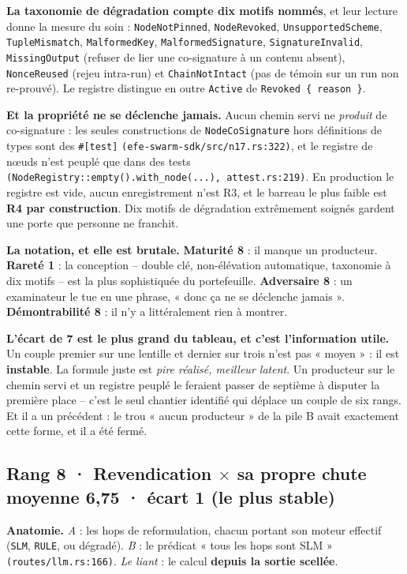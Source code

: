 \documentclass[10pt]{article}
\newcommand{\best}[1]{{\color{green}\textbf{#1}}}
\newcommand{\pire}[1]{{\color{red}\textbf{#1}}}
\newcommand{\sz}[1]{{\small\color{grey}\textsf{#1}}}
\newcommand{\code}[1]{\texttt{\small #1}}
\newcommand{\x}{$\times$}
\newcommand{\loc}[1]{{\footnotesize\color{grey}\texttt{#1}}}
\newcommand{\couple}[4]{%
  \subsection{#1 · #2 \hfill {\normalsize\color{grey}moyenne \textbf{#3} · écart #4}}}
\begin{document}
\textbf{La taxonomie de dégradation compte dix motifs nommés}, et leur lecture donne la mesure du
soin : \code{NodeNotPinned}, \code{NodeRevoked}, \code{UnsupportedScheme}, \code{TupleMismatch},
\code{MalformedKey}, \code{MalformedSignature}, \code{SignatureInvalid}, \code{MissingOutput}
\sz{(refuser de lier une co-signature à un contenu absent)}, \code{NonceReused} \sz{(rejeu intra-run)}
et \code{ChainNotIntact} \sz{(pas de témoin sur un run non re-prouvé)}. Le registre distingue en outre
\code{Active} de \code{Revoked \{ reason \}}.

\begin{alerte}
\textbf{Et la propriété ne se déclenche jamais.} Aucun chemin servi ne \emph{produit} de co-signature :
les seules constructions de \code{NodeCoSignature} hors définitions de types sont des \code{\#[test]}
\loc{(efe-swarm-sdk/src/n17.rs:322)}, et le registre de n\oe uds n'est peuplé que dans des tests
\loc{(NodeRegistry::empty().with\_node(...), attest.rs:219)}. En production le registre est vide, aucun
enregistrement n'est R3, et le barreau le plus faible est \textbf{R4 par construction}. Dix motifs de
dégradation extrêmement soignés gardent une porte que personne ne franchit.
\end{alerte}

\textbf{La notation, et elle est brutale.} \pire{Maturité 8} : il manque un producteur.
\best{Rareté 1} : la conception -- double clé, non-élévation automatique, taxonomie à dix motifs -- est
la plus sophistiquée du portefeuille. \pire{Adversaire 8} : un examinateur le tue en une phrase, « donc
ça ne se déclenche jamais ». \pire{Démontrabilité 8} : il n'y a littéralement rien à montrer.

\begin{piste}
\textbf{L'écart de \pire{7} est le plus grand du tableau, et c'est l'information utile.} Un couple
premier sur une lentille et dernier sur trois n'est pas « moyen » : il est \textbf{instable}. La
formule juste est \emph{pire réalisé, meilleur latent}. Un producteur sur le chemin servi et un
registre peuplé le feraient passer de septième à disputer la première place -- c'est le seul chantier
identifié qui déplace un couple de six rangs. Et il a un précédent : le trou « aucun producteur » de la
pile B avait exactement cette forme, et il a été fermé.
\end{piste}

\couple{Rang 8}{Revendication \x{} sa propre chute}{6,75}{1 \sz{(le plus stable)}}

\textbf{Anatomie.} \emph{A} : les hops de reformulation, chacun portant son moteur effectif
\sz{(\code{SLM}, \code{RULE}, ou dégradé)}. \emph{B} : le prédicat « tous les hops sont SLM »
\loc{(routes/llm.rs:166)}. \emph{Le liant} : le calcul \textbf{depuis la sortie scellée}.
\end{document}
